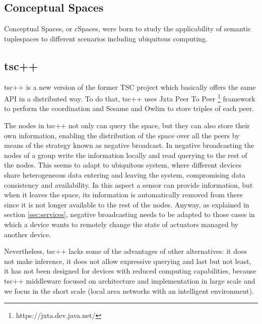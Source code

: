 \subsection{Conceptual Spaces}





Conceptual Spaces, or cSpaces, were born to study the applicability of semantic tuplespaces to different scenarios including ubiquitous computing.



\subsection{tsc++}




tsc++ \cite{krummenacher_open_2009} is a new version of the former TSC project\cite{fensel_triple-space_2004} which basically offers
the same API in a distributed way. To do that, tsc++ uses Jxta Peer To Peer \footnote{https://jxta.dev.java.net/} framework to perform the
coordination and Sesame \cite{broekstra_sesame:_2002} and Owlim \cite{kiryakov_owlimpragmatic_2005} to store triples of each peer.

The nodes in tsc++ not only can query the space, but they can also store their own information, enabling the distribution
of the space over all the peers by means of the strategy known as negative broadcast. In negative broadcasting the nodes
of a group write the information locally and read querying to the rest of the nodes. This seems to adapt to
ubiquitous system, where different devices share heterogeneous data entering and leaving the system, compromising data consistency
and availability. In this aspect a sensor can provide information, but when it leaves the space, its information is automatically
removed from there since it is not longer available to the rest of the nodes. Anyway, as explained in section \ref{sec:services},
negative broadcasting needs to be adapted to those cases in which a device wants to remotely change the state of actuators managed
by another device.

Nevertheless, tsc++ lacks some of the advantages of other alternatives: it does not make inference, it does not allow expressive querying
and last but not least, it has not been designed for devices with reduced computing capabilities, because tsc++ middleware focused on
architecture and implementation in large scale and we focus in the short scale (local area networks with an intelligent environment).


